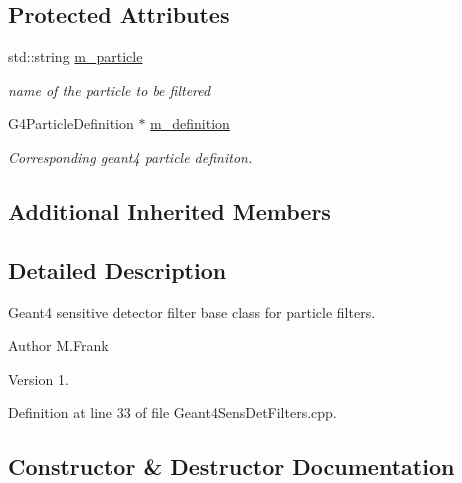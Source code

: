 \subsection*{Protected Attributes}
\begin{DoxyCompactItemize}
\item 
std\+::string \hyperlink{struct_d_d4hep_1_1_simulation_1_1_particle_filter_a410c1fd6ed11ffb97571fdeac010d882}{m\+\_\+particle}
\begin{DoxyCompactList}\small\item\em name of the particle to be filtered \end{DoxyCompactList}\item 
G4\+Particle\+Definition $\ast$ \hyperlink{struct_d_d4hep_1_1_simulation_1_1_particle_filter_ae3cc90b48466de4f0a7d38544db44024}{m\+\_\+definition}
\begin{DoxyCompactList}\small\item\em Corresponding geant4 particle definiton. \end{DoxyCompactList}\end{DoxyCompactItemize}
\subsection*{Additional Inherited Members}


\subsection{Detailed Description}
Geant4 sensitive detector filter base class for particle filters. 

\begin{DoxyAuthor}{Author}
M.\+Frank 
\end{DoxyAuthor}
\begin{DoxyVersion}{Version}
1. 
\end{DoxyVersion}


Definition at line 33 of file Geant4\+Sens\+Det\+Filters.\+cpp.



\subsection{Constructor \& Destructor Documentation}
\hypertarget{struct_d_d4hep_1_1_simulation_1_1_particle_filter_a52c16a1189b557c7c2140e370b747043}{}\label{struct_d_d4hep_1_1_simulation_1_1_particle_filter_a52c16a1189b557c7c2140e370b747043} 
